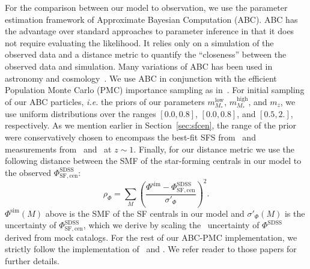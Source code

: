 \documentclass[12pt, letterpaper, preprint, tighten]{aastex62}
\newcommand{\todo}[1]{{\bf \textcolor{red}{#1}}}
\newcommand{\beq}{\begin{equation}}
\newcommand{\eeq}{\end{equation}}
\begin{document}
For the comparison between our model to observation, we use the parameter 
estimation framework of Approximate Bayesian Computation (ABC). ABC has the 
advantage over standard approaches to parameter inference in that it does not 
require evaluating the likelihood. It relies only on a simulation of the observed 
data and a distance metric to quantify the ``closeness'' between the observed data
and simulation. Many variations of ABC has been used in astronomy and 
cosmology~\citep[\emph{e.g.}][]{cameron2012,weyant2013,ishida2015,alsing2018}. 
We use ABC in conjunction with the efficient Population Monte Carlo (PMC)
importance sampling as in~\citep{hahn2017b, hahn2017a}. For initial sampling 
of our ABC particles, \emph{i.e.} the priors of our parameters 
$m^\mathrm{low}_{M_*}$, $m^\mathrm{high}_{M_*}$, and $m_z$, we use uniform 
distributions over the ranges $[0.0, 0.8]$, $[0.0, 0.8]$, and 
$[0.5, 2.]$, respectively. As we mention earlier in Section~\ref{sec:sfcen}, 
the range of the prior were conservatively chosen to encompass the best-fit 
SFS from~\cite{speagle2014} 
and measurements from~\cite{moustakas2013} and~\cite{lee2015} at $z \sim 1$. 
Finally, for our distance metric we use the following distance between 
the SMF of the star-forming centrals in our model to the observed 
$\Phi^\mathrm{SDSS}_\mathrm{SF,cen}$: 
\beq
\rho_\Phi = \sum\limits_{M} \left( \frac{\Phi^\mathrm{sim} - \Phi^\mathrm{SDSS}_\mathrm{SF,cen}}{\sigma'_\Phi}\right)^2.
\eeq
$\Phi^\mathrm{sim}(M)$ above is the SMF of the SF centrals in our model 
and $\sigma'_\Phi(M)$ is the uncertainty of $\Phi^\mathrm{SDSS}_\mathrm{SF,cen}$, 
which we derive by scaling the~\cite{li2009} uncertainty of $\Phi^\mathrm{SDSS}$ 
derived from mock catalogs. %
For the rest of our ABC-PMC implementation, we strictly follow the implementation 
of~\cite{hahn2017a} and \cite{hahn2017b}. We refer reader to those papers for 
further details.
\end{document}
